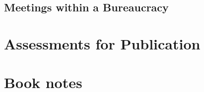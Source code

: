 \documentclass{book}
\begin{document}
  \section{Meetings within a Bureaucracy}
    
    
    
    
    
    
    
    
    






\appendix

\chapter{Assessments for Publication}

\chapter{Book notes}
\newpage
\newpage
\newpage
\newpage
\newpage



\clearpage

\printglossaries

\nocite{*} %


\end{document}
